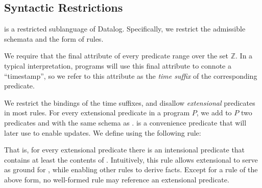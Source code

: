 \subsection{Syntactic Restrictions}
\label{sec:syntaxrestrictions}

\slang is a restricted sublanguage of Datalog.  Specifically, we restrict the
admissible schemata and the form of rules.

We require that the final attribute of every \slang
predicate range over the set $\mathbb{Z}$.  In a typical
interpretation, \slang programs will use this final attribute to connote a
``timestamp'', so we refer to this attribute as the \emph{time suffix} of the
corresponding predicate.

We restrict the bindings of the time suffixes, and
disallow {\em extensional} predicates in most rules.
%
%
For every extensional predicate  in a \slang program $P$, we add to
$P$ two predicates  and  with the same schema
as .   is a convenience predicate that will later
use to enable updates.  We define  using the following rule:


That is, for every extensional predicate  there is an intensional
predicate  that contains at least the contents of .
Intuitively, this rule allows extensional to serve as ground for
, while enabling other rules to derive  facts.
Except for a rule of the above form, no well-formed \slang rule may reference
an extensional predicate.

